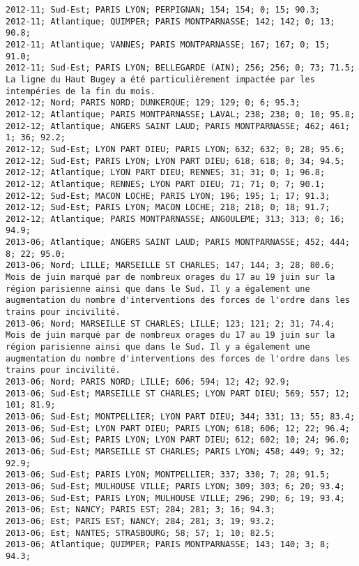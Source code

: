 \documentclass{article}
\begin{document}
\begin{Verbatim}[commandchars=\\\{\}]
2012-11; Sud-Est; PARIS LYON; PERPIGNAN; 154; 154; 0; 15; 90.3; 
2012-11; Atlantique; QUIMPER; PARIS MONTPARNASSE; 142; 142; 0; 13; 90.8; 
2012-11; Atlantique; VANNES; PARIS MONTPARNASSE; 167; 167; 0; 15; 91.0; 
2012-11; Sud-Est; PARIS LYON; BELLEGARDE (AIN); 256; 256; 0; 73; 71.5; La ligne du Haut Bugey a été particulièrement impactée par les intempéries de la fin du mois.
2012-12; Nord; PARIS NORD; DUNKERQUE; 129; 129; 0; 6; 95.3; 
2012-12; Atlantique; PARIS MONTPARNASSE; LAVAL; 238; 238; 0; 10; 95.8; 
2012-12; Atlantique; ANGERS SAINT LAUD; PARIS MONTPARNASSE; 462; 461; 1; 36; 92.2; 
2012-12; Sud-Est; LYON PART DIEU; PARIS LYON; 632; 632; 0; 28; 95.6; 
2012-12; Sud-Est; PARIS LYON; LYON PART DIEU; 618; 618; 0; 34; 94.5; 
2012-12; Atlantique; LYON PART DIEU; RENNES; 31; 31; 0; 1; 96.8; 
2012-12; Atlantique; RENNES; LYON PART DIEU; 71; 71; 0; 7; 90.1; 
2012-12; Sud-Est; MACON LOCHE; PARIS LYON; 196; 195; 1; 17; 91.3; 
2012-12; Sud-Est; PARIS LYON; MACON LOCHE; 218; 218; 0; 18; 91.7; 
2012-12; Atlantique; PARIS MONTPARNASSE; ANGOULEME; 313; 313; 0; 16; 94.9; 
2013-06; Atlantique; ANGERS SAINT LAUD; PARIS MONTPARNASSE; 452; 444; 8; 22; 95.0; 
2013-06; Nord; LILLE; MARSEILLE ST CHARLES; 147; 144; 3; 28; 80.6; Mois de juin marqué par de nombreux orages du 17 au 19 juin sur la région parisienne ainsi que dans le Sud. Il y a également une augmentation du nombre d'interventions des forces de l'ordre dans les trains pour incivilité.
2013-06; Nord; MARSEILLE ST CHARLES; LILLE; 123; 121; 2; 31; 74.4; Mois de juin marqué par de nombreux orages du 17 au 19 juin sur la région parisienne ainsi que dans le Sud. Il y a également une augmentation du nombre d'interventions des forces de l'ordre dans les trains pour incivilité.
2013-06; Nord; PARIS NORD; LILLE; 606; 594; 12; 42; 92.9; 
2013-06; Sud-Est; MARSEILLE ST CHARLES; LYON PART DIEU; 569; 557; 12; 101; 81.9; 
2013-06; Sud-Est; MONTPELLIER; LYON PART DIEU; 344; 331; 13; 55; 83.4; 
2013-06; Sud-Est; LYON PART DIEU; PARIS LYON; 618; 606; 12; 22; 96.4; 
2013-06; Sud-Est; PARIS LYON; LYON PART DIEU; 612; 602; 10; 24; 96.0; 
2013-06; Sud-Est; MARSEILLE ST CHARLES; PARIS LYON; 458; 449; 9; 32; 92.9; 
2013-06; Sud-Est; PARIS LYON; MONTPELLIER; 337; 330; 7; 28; 91.5; 
2013-06; Sud-Est; MULHOUSE VILLE; PARIS LYON; 309; 303; 6; 20; 93.4; 
2013-06; Sud-Est; PARIS LYON; MULHOUSE VILLE; 296; 290; 6; 19; 93.4; 
2013-06; Est; NANCY; PARIS EST; 284; 281; 3; 16; 94.3; 
2013-06; Est; PARIS EST; NANCY; 284; 281; 3; 19; 93.2; 
2013-06; Est; NANTES; STRASBOURG; 58; 57; 1; 10; 82.5; 
2013-06; Atlantique; QUIMPER; PARIS MONTPARNASSE; 143; 140; 3; 8; 94.3; 

\end{Verbatim}
\end{document}
